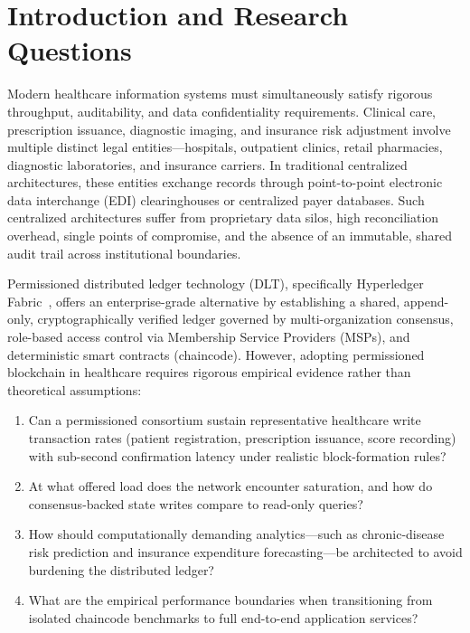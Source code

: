 \documentclass[runningheads]{llncs}
\begin{document}
\section{Introduction and Research Questions}
Modern healthcare information systems must simultaneously satisfy rigorous throughput, auditability, and data confidentiality requirements. Clinical care, prescription issuance, diagnostic imaging, and insurance risk adjustment involve multiple distinct legal entities---hospitals, outpatient clinics, retail pharmacies, diagnostic laboratories, and insurance carriers. In traditional centralized architectures, these entities exchange records through point-to-point electronic data interchange (EDI) clearinghouses or centralized payer databases. Such centralized architectures suffer from proprietary data silos, high reconciliation overhead, single points of compromise, and the absence of an immutable, shared audit trail across institutional boundaries.

Permissioned distributed ledger technology (DLT), specifically Hyperledger Fabric~\cite{androulaki2018hyperledger}, offers an enterprise-grade alternative by establishing a shared, append-only, cryptographically verified ledger governed by multi-organization consensus, role-based access control via Membership Service Providers (MSPs), and deterministic smart contracts (chaincode). However, adopting permissioned blockchain in healthcare requires rigorous empirical evidence rather than theoretical assumptions:
\begin{enumerate}
    \item Can a permissioned consortium sustain representative healthcare write transaction rates (patient registration, prescription issuance, score recording) with sub-second confirmation latency under realistic block-formation rules?
    \item At what offered load does the network encounter saturation, and how do consensus-backed state writes compare to read-only queries?
    \item How should computationally demanding analytics---such as chronic-disease risk prediction and insurance expenditure forecasting---be architected to avoid burdening the distributed ledger?
    \item What are the empirical performance boundaries when transitioning from isolated chaincode benchmarks to full end-to-end application services?
\end{enumerate}
\end{document}

